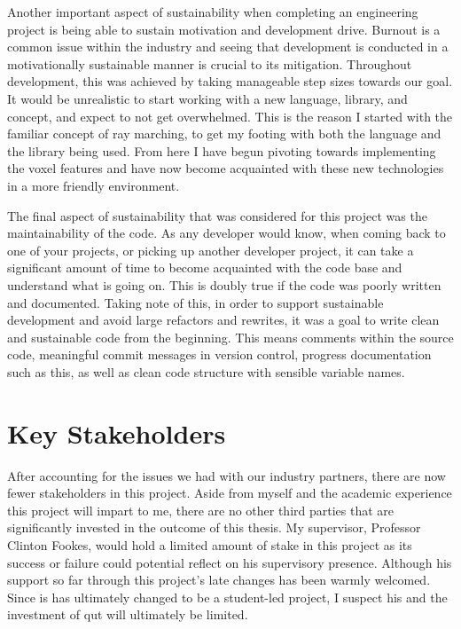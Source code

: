 \documentclass[titlepage]{article}
\begin{document}
Another important aspect of sustainability when completing an engineering project is being able to sustain motivation and development drive. Burnout is a common issue within the industry and seeing that development is conducted in a motivationally sustainable manner is crucial to its mitigation. Throughout development, this was achieved by taking manageable step sizes towards our goal. It would be unrealistic to start working with a new language, library, and concept, and expect to not get overwhelmed. This is the reason I started with the familiar concept of ray marching, to get my footing with both the language and the library being used. From here I have begun pivoting towards implementing the voxel features and have now become acquainted with these new technologies in a more friendly environment.

The final aspect of sustainability that was considered for this project was the maintainability of the code. As any developer would know, when coming back to one of your projects, or picking up another developer project, it can take a significant amount of time to become acquainted with the code base and understand what is going on. This is doubly true if the code was poorly written and documented. Taking note of this, in order to support sustainable development and avoid large refactors and rewrites, it was a goal to write clean and sustainable code from the beginning. This means comments within the source code, meaningful commit messages in version control, progress documentation such as this, as well as clean code structure with sensible variable names.

\section{Key Stakeholders}
After accounting for the issues we had with our industry partners, there are now fewer stakeholders in this project. Aside from myself and the academic experience this project will impart to me, there are no other third parties that are significantly invested in the outcome of this thesis. My supervisor, Professor Clinton Fookes, would hold a limited amount of stake in this project as its success or failure could potential reflect on his supervisory presence. Although his support so far through this project's late changes has been warmly welcomed. Since is has ultimately changed to be a student-led project, I suspect his and the investment of \acrshort{qut} will ultimately be limited.

\appendix
\end{document}
